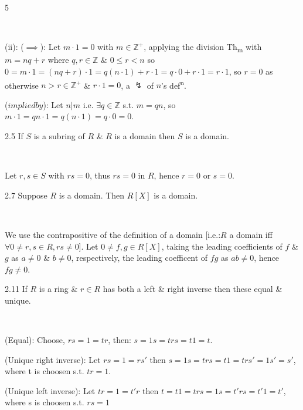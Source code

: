 \documentclass[8pt]{extarticle}
\makeatletter
\renewenvironment{proof}[1][\proofname]{%
  \par\noindent
  \pushQED{\qed}%
  \normalfont\itshape #1\@addpunct{.}\ \normalfont\ignorespaces
}{%
  \popQED%
  \par
}
\makeatother
\begin{document}
\begin{multicols}{5}
\begin{proof}
            (ii): (\(\implies\)): Let \(m\cdot 1=0\) with \(m\in\mathbb{Z}^+\), applying the division Th\textsubscript{m} with \(m=nq+r\) where \(q,r\in\mathbb{Z}\) \& \(0\le r<n\) so \(0=m\cdot1=(nq+r)\cdot1=q(n\cdot1)+r\cdot1=q\cdot0+r\cdot1=r\cdot1\), so \(r=0\) as otherwise \(n>r\in\mathbb{Z}^+\) \& \(r\cdot 1=0\), a \(\lightning\) of \(n\)'s def\textsuperscript{n}.

            (\(impliedby\)): Let \(n|m\) i.e. \(\exists q\in\mathbb{Z}\) s.t. \(m=qn\), so \(m\cdot1=qn\cdot1=q(n\cdot1)=q\cdot0=0\).
        \end{proof}


        \begin{lemma}{2.5}
            If \(S\) is a subring of \(R\) \& \(R\) is a domain then \(S\) is a domain.
        \end{lemma}

        \begin{proof}
            Let \(r,s\in S\) with \(rs=0\), thus \(rs=0\) in \(R\), hence \(r=0\) or \(s=0\).
        \end{proof}

        \begin{proposition}{2.7}
            Suppose \(R\) is a domain. Then \(R[X]\) is a domain.
        \end{proposition}

        \begin{proof}
            We use the contrapositive of the definition of a domain [i.e.:\(R\) a domain iff \(\forall 0\ne r,s\in R, rs\ne 0\)]. Let \(0\ne f,g\in R[X]\), taking the leading coefficients of \(f\) \& \(g\) as \(a\ne0\) \& \(b\ne0\), respectively, the leading coefficent of \(fg\) as \(ab\ne0\), hence \(fg\ne0\).
        \end{proof}

        \begin{lemma}{2.11}
            If \(R\) is a ring \& \(r\in R\) has both a left \& right inverse then these equal \& unique.
        \end{lemma}

        \begin{proof}
            (Equal): Choose, \(rs=1=tr\), then: \(s=1s=trs=t1=t\).

            (Unique right inverse): Let \(rs=1=rs'\) then \(s=1s=trs=t1=trs'=1s'=s'\), where t is choosen s.t. \(tr=1\).

            (Unique left inverse): Let \(tr=1=t'r\) then \(t=t1=trs=1s=t'rs=t'1=t'\), where s is choosen s.t. \(rs=1\)
        \end{proof}


\end{multicols}
\end{document}
